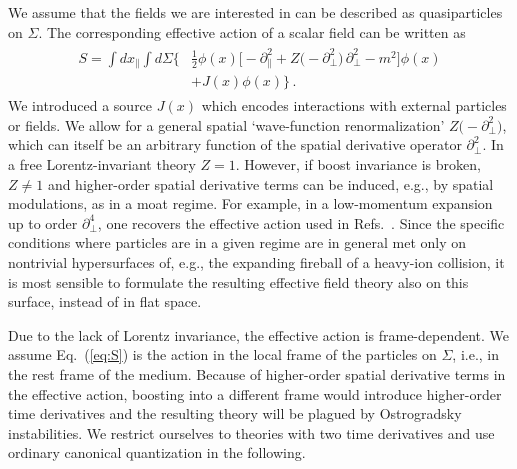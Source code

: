 \documentclass[reprint,superscriptaddress,english,preprintnumbers,amsmath,amssymb,aps,prx]{revtex4-2}
\def\Eq#1{Eq.~(\ref{#1})}
\begin{document}
We assume that the fields we are interested in can be described as quasiparticles on $\Sigma$. The corresponding effective action of a scalar field can be written as
\begin{align}\label{eq:S}
\begin{split}
S = \int\!\!\! dx_\parallel\! \int\!\!\! d\Sigma\bigg\{& \frac{1}{2}\phi(x) \Big[\! -\partial_\parallel^2 + Z\big(-\partial_\perp^2\big)\, \partial_\perp^2 - m^2  \Big] \phi(x)\\
&+ J(x)\phi(x)\bigg\}\,.
\end{split}
\end{align}
We introduced a source $J(x)$ which encodes interactions with external particles or fields.
We allow for a general spatial `wave-function renormalization' $Z\big(-\partial_\perp^2\big)$, which can itself be an arbitrary function of the spatial derivative operator $\partial_\perp^2$. In a free Lorentz-invariant theory $Z=1$. However, if boost invariance is broken, $Z\neq 1$ and higher-order spatial derivative terms can be induced, e.g., by spatial modulations, as in a moat regime. For example, in a low-momentum expansion up to order $\partial_\perp^4$, one recovers the effective action used in Refs.\ \cite{Pisarski:2020dnx,Pisarski:2021qof}.
Since the specific conditions where particles are in a given regime are in general met only on nontrivial hypersurfaces of, e.g., the expanding fireball of a heavy-ion collision, it is most sensible to formulate the resulting effective field theory also on this surface, instead of in flat space.  

Due to the lack of Lorentz invariance, the effective action is frame-dependent. We assume \Eq{eq:S} is the action in the local frame of the particles on $\Sigma$, i.e., in the rest frame of the medium. Because of higher-order spatial derivative terms in the effective action, boosting into a different frame would introduce higher-order time derivatives and the resulting theory will be plagued by Ostrogradsky instabilities. We restrict ourselves to theories with two time derivatives and use ordinary canonical quantization in the following.
\end{document}
